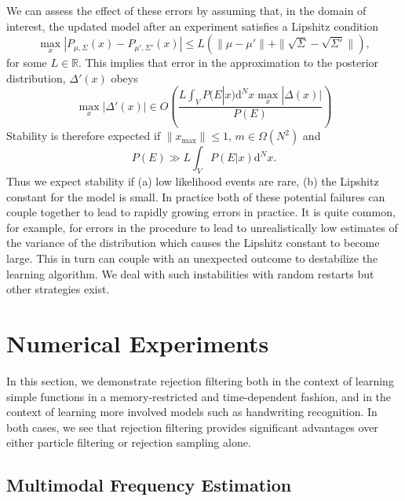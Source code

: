 \documentclass[twoside]{article}
\begin{document}
We can assess the effect of these errors by assuming that, in the domain of interest, the updated model after an experiment satisfies a Lipshitz condition
\begin{equation}
\max_x|P_{\mu,\Sigma}(x) - P_{\mu' ,\Sigma'}(x)| \le L(\|\mu- \mu'\| +\|\sqrt{\Sigma}- \sqrt{\Sigma'}\|),
\end{equation}
for some $L\in \mathbb{R}$.  This implies that error in the approximation to the posterior distribution, $\Delta'(x)$ obeys
\begin{equation}
\max_x |\Delta'(x)| \in O\left( \frac{L\int_V P(E|x) \mathrm{d}^Nx \max_x |\Delta(x)|}{P(E)}\right)
\end{equation}
Stability is therefore expected if $\|x_{\max}\|\le 1$, $m\in \Omega(N^2)$ and
\begin{equation}
P(E) \gg {L\int_V P(E|x) \mathrm{d}^Nx }.
\end{equation}
Thus we expect stability if (a) low likelihood events are rare, (b) the Lipshitz constant for the model is small.  In practice both of these potential failures can couple together to lead to rapidly growing errors in practice.  It is quite common, for example, for errors in the procedure to lead to unrealistically low estimates of the variance of the distribution which causes the Lipshitz constant to become large.  This in turn can couple with an unexpected outcome to destabilize the learning algorithm.  We deal with such instabilities with random restarts but other strategies exist.

\section{Numerical Experiments}
\label{sec:numerical-experiments}

In this section, we demonstrate rejection filtering both in the context of
learning simple functions in a memory-restricted and time-dependent fashion,
and in the context of learning more involved models such as handwriting
recognition. In both cases, we see that rejection filtering provides significant
advantages over either particle filtering or rejection sampling alone.

\subsection{Multimodal Frequency Estimation}
\end{document}
